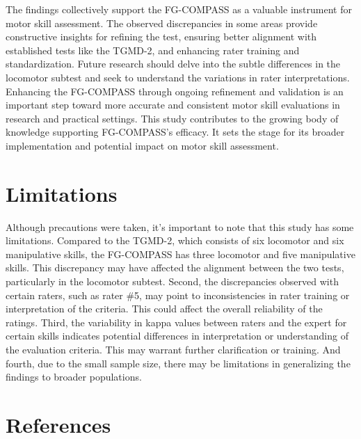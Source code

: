 \documentclass[
  man,
  colorlinks=true,linkcolor=blue,citecolor=blue,urlcolor=blue]{apa7}
\begin{document}
The findings collectively support the FG-COMPASS as a valuable
instrument for motor skill assessment. The observed discrepancies in
some areas provide constructive insights for refining the test, ensuring
better alignment with established tests like the TGMD-2, and enhancing
rater training and standardization. Future research should delve into
the subtle differences in the locomotor subtest and seek to understand
the variations in rater interpretations. Enhancing the FG-COMPASS
through ongoing refinement and validation is an important step toward
more accurate and consistent motor skill evaluations in research and
practical settings. This study contributes to the growing body of
knowledge supporting FG-COMPASS's efficacy. It sets the stage for its
broader implementation and potential impact on motor skill assessment.

\hypertarget{limitations}{%
\section{Limitations}\label{limitations}}

Although precautions were taken, it's important to note that this study
has some limitations. Compared to the TGMD-2, which consists of six
locomotor and six manipulative skills, the FG-COMPASS has three
locomotor and five manipulative skills. This discrepancy may have
affected the alignment between the two tests, particularly in the
locomotor subtest. Second, the discrepancies observed with certain
raters, such as rater \#5, may point to inconsistencies in rater
training or interpretation of the criteria. This could affect the
overall reliability of the ratings. Third, the variability in kappa
values between raters and the expert for certain skills indicates
potential differences in interpretation or understanding of the
evaluation criteria. This may warrant further clarification or training.
And fourth, due to the small sample size, there may be limitations in
generalizing the findings to broader populations.

\hypertarget{references}{%
\section{References}\label{references}}
\end{document}
